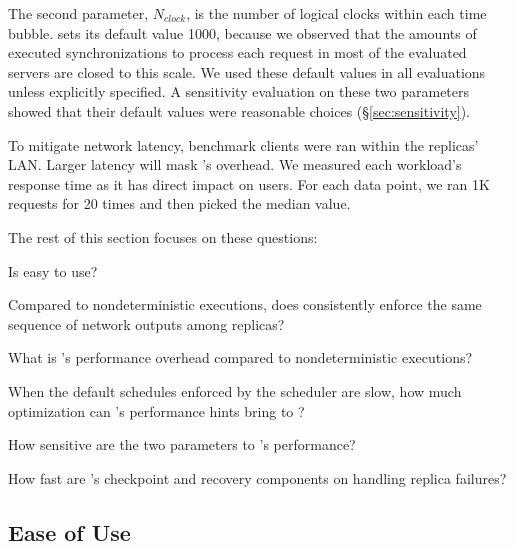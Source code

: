 The second parameter, $N_{clock}$, is the number of logical 
clocks within each time bubble. \xxx sets its default value 1000, because we 
observed that the amounts of executed \pthread synchronizations to process each 
request in most of the evaluated servers are closed to this scale. We used 
these default values in all evaluations unless explicitly specified. A 
sensitivity evaluation on these two parameters showed that their default 
values were reasonable choices (\S\ref{sec:sensitivity}).

To mitigate network latency, benchmark clients were ran within 
the replicas' LAN. Larger latency will mask \xxx's overhead. We measured each 
workload's response time as it has direct impact on users. For each data 
point, we ran 1K requests for 20 times and then picked the median value.

The rest of this section focuses on these questions:

\begin{tightenum}

\item[\S\ref{sec:ease-of-use}:] Is \xxx easy to use?

\item[\S\ref{sec:correctness}:] Compared to nondeterministic executions, does 
\xxx consistently enforce the same sequence of network outputs among replicas?

\item[\S\ref{sec:overhead}:] What is \xxx's performance overhead compared to 
nondeterministic executions?

\item[\S\ref{sec:hint}:] When the default schedules enforced by the \parrot 
\dmt scheduler are slow, how much optimization can \parrot's performance hints 
bring to \xxx?

\item[\S\ref{sec:sensitivity}:] How sensitive are the two \timealgo parameters 
to \xxx's performance?

\item[\S\ref{sec:recovery}:] How fast are \xxx's checkpoint and recovery 
components on handling replica failures?


\end{tightenum}







\subsection{Ease of Use} \label{sec:ease-of-use}

